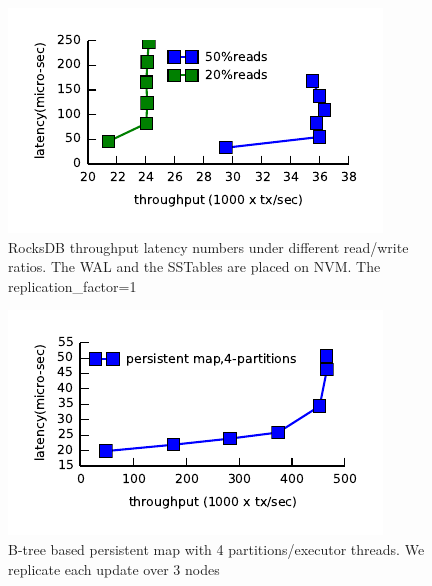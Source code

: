 \begin{figure}[tbp]   
	\centering
	\includegraphics[width=\linewidth]{plot/rocksdbcompare.pdf} 
	\caption{\small RocksDB throughput latency numbers under different read/write ratios. The WAL and the SSTables are placed on NVM. The replication\_factor=1} 
	\label{fig:pmemkv} 
\end{figure}

\begin{figure}[tbp]   
	\centering
	\includegraphics[width=\linewidth]{plot/bliztree-partition.pdf} 
	\caption{\small B-tree based persistent map with 4 partitions/executor threads. We replicate each update over 3 nodes} 
	\label{fig:pmemkv} 
\end{figure}








